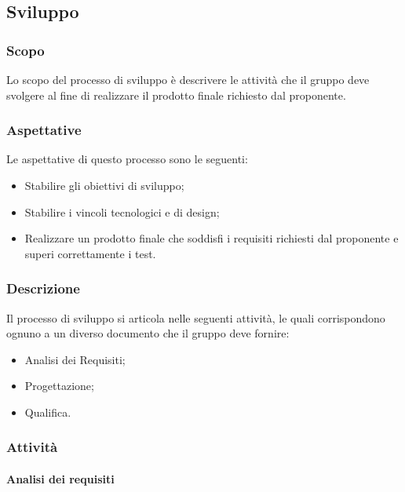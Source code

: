 \documentclass[../norme-di-progetto.tex]{subfiles}
\begin{document}

\subsection{Sviluppo}

\subsubsection{Scopo}
Lo scopo del processo di sviluppo è descrivere le attività che il gruppo deve svolgere al fine di realizzare il prodotto finale richiesto dal proponente.

\subsubsection{Aspettative}
Le aspettative di questo processo sono le seguenti:
\begin{itemize}
  \item Stabilire gli obiettivi di sviluppo;
  \item Stabilire i vincoli tecnologici e di design;
  \item Realizzare un prodotto finale che soddisfi i requisiti richiesti dal proponente e superi correttamente i test.
\end{itemize}

\subsubsection{Descrizione}
Il processo di sviluppo si articola nelle seguenti attività, le quali corrispondono ognuno a un diverso documento che il gruppo deve fornire:
\begin{itemize}
  \item Analisi dei Requisiti;
  \item Progettazione;
  \item Qualifica.
\end{itemize}

\subsubsection{Attività}

\paragraph{Analisi dei requisiti}
\end{document}
